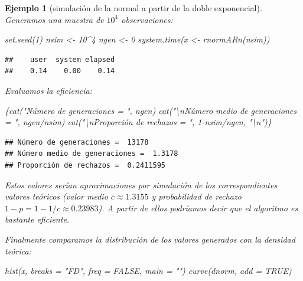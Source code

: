 \documentclass[
]{book}
\newenvironment{Shaded}{\begin{snugshade}}{\end{snugshade}}
\newcommand{\AttributeTok}[1]{\textcolor[rgb]{0.77,0.63,0.00}{#1}}
\newcommand{\ConstantTok}[1]{\textcolor[rgb]{0.00,0.00,0.00}{#1}}
\newcommand{\DecValTok}[1]{\textcolor[rgb]{0.00,0.00,0.81}{#1}}
\newcommand{\FunctionTok}[1]{\textcolor[rgb]{0.00,0.00,0.00}{#1}}
\newcommand{\NormalTok}[1]{#1}
\newcommand{\OtherTok}[1]{\textcolor[rgb]{0.56,0.35,0.01}{#1}}
\newcommand{\SpecialCharTok}[1]{\textcolor[rgb]{0.00,0.00,0.00}{#1}}
\newcommand{\StringTok}[1]{\textcolor[rgb]{0.31,0.60,0.02}{#1}}
\theoremstyle{break}
\newtheorem{example}{Ejemplo}[chapter]
\theoremstyle{nonumberplain}
\begin{document}
\begin{example}[simulación de la normal a partir de la doble exponencial]
Generamos una muestra de \(10^4\) observaciones:

\begin{Shaded}
\begin{Highlighting}[]
\FunctionTok{set.seed}\NormalTok{(}\DecValTok{1}\NormalTok{)}
\NormalTok{nsim }\OtherTok{\textless{}{-}} \DecValTok{10}\SpecialCharTok{\^{}}\DecValTok{4}
\NormalTok{ngen }\OtherTok{\textless{}{-}} \DecValTok{0}
\FunctionTok{system.time}\NormalTok{(x }\OtherTok{\textless{}{-}} \FunctionTok{rnormARn}\NormalTok{(nsim))}
\end{Highlighting}
\end{Shaded}

\begin{verbatim}
##    user  system elapsed 
##    0.14    0.00    0.14
\end{verbatim}

Evaluamos la eficiencia:

\begin{Shaded}
\begin{Highlighting}[]
\NormalTok{\{}\FunctionTok{cat}\NormalTok{(}\StringTok{"Número de generaciones = "}\NormalTok{, ngen)}
\FunctionTok{cat}\NormalTok{(}\StringTok{"}\SpecialCharTok{\textbackslash{}n}\StringTok{Número medio de generaciones = "}\NormalTok{, ngen}\SpecialCharTok{/}\NormalTok{nsim)}
\FunctionTok{cat}\NormalTok{(}\StringTok{"}\SpecialCharTok{\textbackslash{}n}\StringTok{Proporción de rechazos = "}\NormalTok{, }\DecValTok{1}\SpecialCharTok{{-}}\NormalTok{nsim}\SpecialCharTok{/}\NormalTok{ngen, }\StringTok{"}\SpecialCharTok{\textbackslash{}n}\StringTok{"}\NormalTok{)\}}
\end{Highlighting}
\end{Shaded}

\begin{verbatim}
## Número de generaciones =  13178
## Número medio de generaciones =  1.3178
## Proporción de rechazos =  0.2411595
\end{verbatim}

Estos valores serían aproximaciones por simulación de los correspondientes valores teóricos (valor medio \(c \approx 1.3155\) y probabilidad de rechazo \(1 - p = 1 - 1/c \approx 0.23983\)).
A partir de ellos podríamos decir que el algoritmo es bastante eficiente.

Finalmente comparamos la distribución de los valores generados con la densidad teórica:

\begin{Shaded}
\begin{Highlighting}[]
\FunctionTok{hist}\NormalTok{(x, }\AttributeTok{breaks =} \StringTok{"FD"}\NormalTok{, }\AttributeTok{freq =} \ConstantTok{FALSE}\NormalTok{, }\AttributeTok{main =} \StringTok{""}\NormalTok{)}
\FunctionTok{curve}\NormalTok{(dnorm, }\AttributeTok{add =} \ConstantTok{TRUE}\NormalTok{)}
\end{Highlighting}
\end{Shaded}


\end{example}
\end{document}

